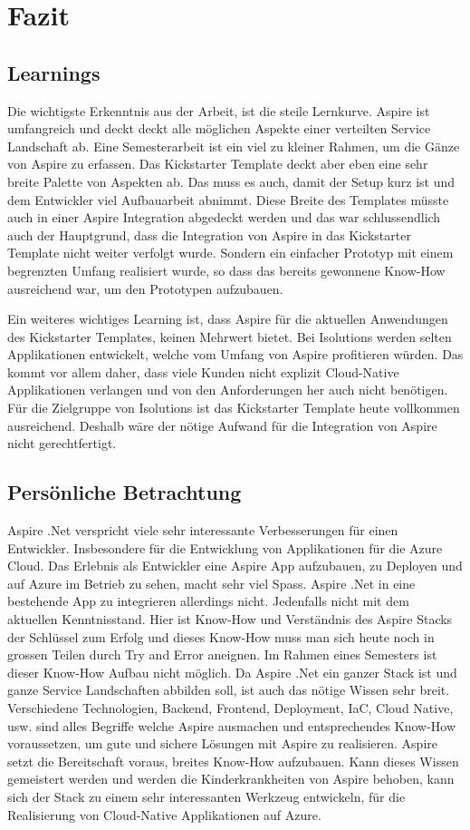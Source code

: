 \section{Fazit}

    \subsection{Learnings}
        Die wichtigste Erkenntnis aus der Arbeit, ist die steile Lernkurve. Aspire ist umfangreich und deckt deckt alle möglichen Aspekte einer verteilten Service Landschaft ab. Eine Semesterarbeit ist ein viel zu kleiner Rahmen, um die Gänze von Aspire zu erfassen. Das Kickstarter Template deckt aber eben eine sehr breite Palette von Aspekten ab. Das muss es auch, damit der Setup kurz ist und dem Entwickler viel Aufbauarbeit abnimmt. Diese Breite des Templates müsste auch in einer Aspire Integration abgedeckt werden und das war schlussendlich auch der Hauptgrund, dass die Integration von Aspire in das Kickstarter Template nicht weiter verfolgt wurde. Sondern ein einfacher Prototyp mit einem begrenzten Umfang realisiert wurde, so dass das bereits gewonnene Know-How ausreichend war, um den Prototypen aufzubauen.

        Ein weiteres wichtiges Learning ist, dass Aspire für die aktuellen Anwendungen des Kickstarter Templates, keinen Mehrwert bietet. Bei Isolutions werden selten Applikationen entwickelt, welche vom Umfang von Aspire profitieren würden. Das kommt vor allem daher, dass viele Kunden nicht explizit Cloud-Native Applikationen verlangen und von den Anforderungen her auch nicht benötigen. Für die Zielgruppe von Isolutions ist das Kickstarter Template heute vollkommen ausreichend. Deshalb wäre der nötige Aufwand für die Integration von Aspire nicht gerechtfertigt.

    \subsection{Persönliche Betrachtung}
        Aspire .Net verspricht viele sehr interessante Verbesserungen für einen Entwickler. Insbesondere für die Entwicklung von Applikationen für die Azure Cloud. Das Erlebnis als Entwickler eine Aspire App aufzubauen, zu Deployen und auf Azure im Betrieb zu sehen, macht sehr viel Spass. Aspire .Net in eine bestehende App zu integrieren allerdings nicht. Jedenfalls nicht mit dem aktuellen Kenntnisstand. Hier ist Know-How und Verständnis des Aspire Stacks der Schlüssel zum Erfolg und dieses Know-How muss man sich heute noch in grossen Teilen durch Try and Error aneignen. Im Rahmen eines Semesters ist dieser Know-How Aufbau nicht möglich. Da Aspire .Net ein ganzer Stack ist und ganze Service Landschaften abbilden soll, ist auch das nötige Wissen sehr breit. Verschiedene Technologien, Backend, Frontend, Deployment, IaC, Cloud Native, usw. sind alles Begriffe welche Aspire ausmachen und entsprechendes Know-How voraussetzen, um gute und sichere Lösungen mit Aspire zu realisieren. Aspire setzt die Bereitschaft voraus, breites Know-How aufzubauen. Kann dieses Wissen gemeistert werden und werden die Kinderkrankheiten von Aspire behoben, kann sich der Stack zu einem sehr interessanten Werkzeug entwickeln, für die Realisierung von Cloud-Native Applikationen auf Azure.

